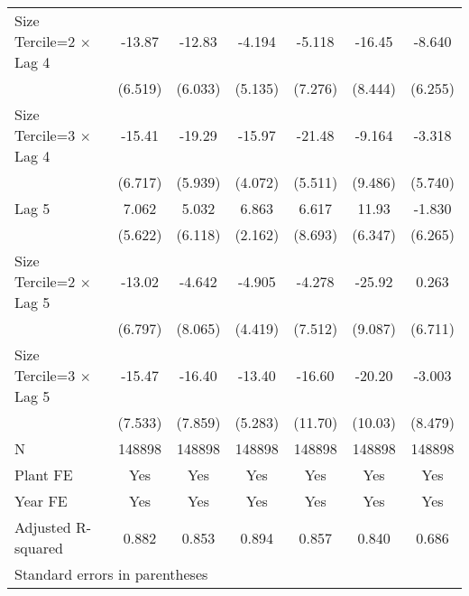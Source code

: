 \begin{table}[htbp]
\begin{tabular}{l*{6}{c}}
\addlinespace
Size Tercile=2 $\times$ Lag 4&   -13.87\sym{*}  &   -12.83\sym{*}  &   -4.194         &   -5.118         &   -16.45         &   -8.640         \\
                &  (6.519)         &  (6.033)         &  (5.135)         &  (7.276)         &  (8.444)         &  (6.255)         \\
\addlinespace
Size Tercile=3 $\times$ Lag 4&   -15.41\sym{*}  &   -19.29\sym{**} &   -15.97\sym{***}&   -21.48\sym{***}&   -9.164         &   -3.318         \\
                &  (6.717)         &  (5.939)         &  (4.072)         &  (5.511)         &  (9.486)         &  (5.740)         \\
\addlinespace
Lag 5           &    7.062         &    5.032         &    6.863\sym{**} &    6.617         &    11.93         &   -1.830         \\
                &  (5.622)         &  (6.118)         &  (2.162)         &  (8.693)         &  (6.347)         &  (6.265)         \\
\addlinespace
Size Tercile=2 $\times$ Lag 5&   -13.02         &   -4.642         &   -4.905         &   -4.278         &   -25.92\sym{**} &    0.263         \\
                &  (6.797)         &  (8.065)         &  (4.419)         &  (7.512)         &  (9.087)         &  (6.711)         \\
\addlinespace
Size Tercile=3 $\times$ Lag 5&   -15.47\sym{*}  &   -16.40\sym{*}  &   -13.40\sym{*}  &   -16.60         &   -20.20\sym{*}  &   -3.003         \\
                &  (7.533)         &  (7.859)         &  (5.283)         &  (11.70)         &  (10.03)         &  (8.479)         \\
\midrule
N               &   148898         &   148898         &   148898         &   148898         &   148898         &   148898         \\
Plant FE        &      Yes         &      Yes         &      Yes         &      Yes         &      Yes         &      Yes         \\
Year FE         &      Yes         &      Yes         &      Yes         &      Yes         &      Yes         &      Yes         \\
Adjusted R-squared&    0.882         &    0.853         &    0.894         &    0.857         &    0.840         &    0.686         \\
\bottomrule
\multicolumn{7}{l}{\footnotesize Standard errors in parentheses}\\

\end{tabular}
\end{table}
